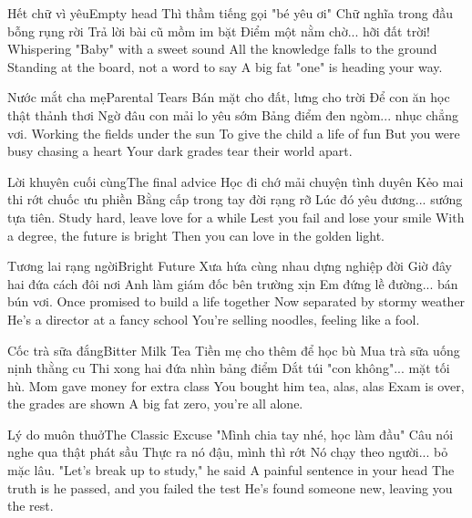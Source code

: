 \begin{tutuyetbox}{Hết chữ vì yêu}{Empty head}
Thì thầm tiếng gọi "bé yêu ơi"
Chữ nghĩa trong đầu bỗng rụng rời
Trả lời bài cũ mồm im bặt
Điểm một nằm chờ... hỡi đất trời!
\tcblower
Whispering "Baby" with a sweet sound
All the knowledge falls to the ground
Standing at the board, not a word to say
A big fat "one" is heading your way.
\end{tutuyetbox}

\begin{tutuyetbox}{Nước mắt cha mẹ}{Parental Tears}
Bán mặt cho đất, lưng cho trời
Để con ăn học thật thảnh thơi
Ngờ đâu con mải lo yêu sớm
Bảng điểm đen ngòm... nhục chẳng vơi.
\tcblower
Working the fields under the sun
To give the child a life of fun
But you were busy chasing a heart
Your dark grades tear their world apart.
\end{tutuyetbox}

\begin{tutuyetbox}{Lời khuyên cuối cùng}{The final advice}
Học đi chớ mải chuyện tình duyên
Kẻo mai thi rớt chuốc ưu phiền
Bằng cấp trong tay đời rạng rỡ
Lúc đó yêu đương... sướng tựa tiên.
\tcblower
Study hard, leave love for a while
Lest you fail and lose your smile
With a degree, the future is bright
Then you can love in the golden light.
\end{tutuyetbox}
\begin{tutuyetbox}{Tương lai rạng ngời}{Bright Future}
Xưa hứa cùng nhau dựng nghiệp đời
Giờ đây hai đứa cách đôi nơi
Anh làm giám đốc bên trường xịn
Em đứng lề đường... bán bún vơi.
\tcblower
Once promised to build a life together
Now separated by stormy weather
He's a director at a fancy school
You're selling noodles, feeling like a fool.
\end{tutuyetbox}

\begin{tutuyetbox}{Cốc trà sữa đắng}{Bitter Milk Tea}
Tiền mẹ cho thêm để học bù
Mua trà sữa uống nịnh thằng cu
Thi xong hai đứa nhìn bảng điểm
Dắt túi "con không"... mặt tối hù.
\tcblower
Mom gave money for extra class
You bought him tea, alas, alas
Exam is over, the grades are shown
A big fat zero, you're all alone.
\end{tutuyetbox}

\begin{tutuyetbox}{Lý do muôn thuở}{The Classic Excuse}
"Mình chia tay nhé, học làm đầu"
Câu nói nghe qua thật phát sầu
Thực ra nó đậu, mình thì rớt
Nó chạy theo người... bỏ mặc lâu.
\tcblower
"Let's break up to study," he said
A painful sentence in your head
The truth is he passed, and you failed the test
He's found someone new, leaving you the rest.
\end{tutuyetbox}

